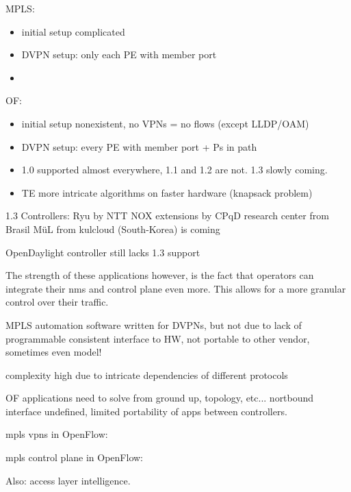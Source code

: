 MPLS:
\begin{itemize}
	\item initial setup complicated
	\item DVPN setup: only each PE with member port
	\item 
\end{itemize}

OF:
\begin{itemize}
	\item initial setup nonexistent, no VPNs = no flows (except LLDP/OAM)
	\item DVPN setup: every PE with member port + Ps in path
	\item 1.0 supported almost everywhere, 1.1 and 1.2 are not. 1.3 slowly coming. 
	\item TE more intricate algorithms on faster hardware (knapsack problem)
\end{itemize}

1.3 Controllers:
Ryu by NTT \cite{ryu}
NOX extensions by CPqD research center from Brasil \cite{cpqd}
M\"{u}L from kulcloud (South-Korea) is coming \cite{mul}

OpenDaylight controller still lacks 1.3 support

\HRule

The strength of these applications however, is the fact that operators can integrate their \ac{nms} and control plane even more. This allows for a more granular control over their traffic.

MPLS automation software written for DVPNs, but not due to lack of programmable consistent interface to HW, not portable to other vendor, sometimes even model!

complexity high due to intricate dependencies of different protocols

\HRule

OF applications need to solve from ground up, topology, etc... nortbound interface undefined, limited portability of apps between controllers. 


\ac{mpls} \acp{vpn} in OpenFlow: \cite{mpls-vpn-openflow}

\ac{mpls} control plane in OpenFlow: \cite{mpls-open}

Also: access layer intelligence.












